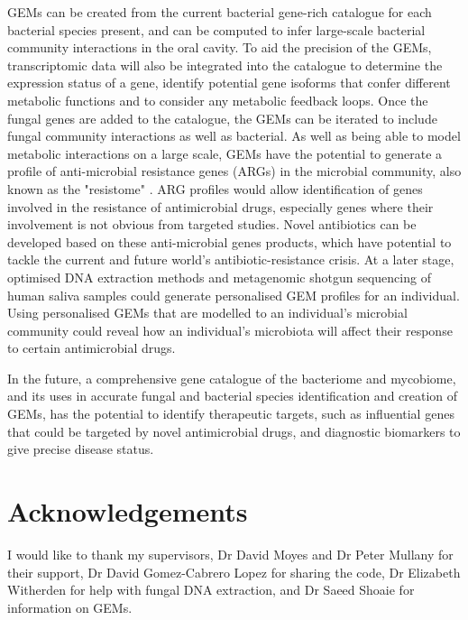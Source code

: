 \documentclass[a4paper]{article}
\begin{document}
GEMs can be created from the current bacterial gene-rich catalogue for each bacterial species present, and can be computed to infer large-scale bacterial community interactions in the oral cavity. To aid the precision of the GEMs, transcriptomic data will also be integrated into the catalogue to determine the expression status of a gene, identify potential gene isoforms that confer different metabolic functions and to consider any metabolic feedback loops. Once the fungal genes are added to the catalogue, the GEMs can be iterated to include fungal community interactions as well as bacterial. As well as being able to model metabolic interactions on a large scale, GEMs have the potential to generate a profile of anti-microbial resistance genes (ARGs) in the microbial community, also known as the "resistome" \cite{wright_antibiotic_2007}. ARG profiles would allow identification of genes involved in the resistance of antimicrobial drugs, especially genes where their involvement is not obvious from targeted studies. Novel antibiotics can be developed based on these anti-microbial genes products, which have potential to tackle the current and future world's antibiotic-resistance crisis. At a later stage, optimised DNA extraction methods and metagenomic shotgun sequencing of human saliva samples could generate personalised GEM profiles for an individual. Using personalised GEMs that are modelled to an individual's microbial community could reveal how an individual's microbiota will affect their response to certain antimicrobial drugs.

In the future, a comprehensive gene catalogue of the bacteriome and mycobiome, and its uses in accurate fungal and bacterial species identification and creation of GEMs, has the potential to identify therapeutic targets, such as influential genes that could be targeted by novel antimicrobial drugs, and diagnostic biomarkers to give precise disease status.

\section{Acknowledgements}
I would like to thank my supervisors, Dr David Moyes and Dr Peter Mullany for their support, Dr David Gomez-Cabrero Lopez for sharing the code, Dr Elizabeth Witherden for help with fungal DNA extraction, and Dr Saeed Shoaie for information on GEMs.

\newpage


\end{document}
